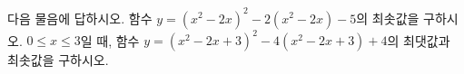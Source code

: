다음 물음에 답하시오.
 함수 $y=(x^2-2x)^2-2(x^2-2x)-5$의 최솟값을 구하시오.
 $0\le x\le 3$일 때, 함수 $y=(x^2-2x+3)^2-4(x^2-2x+3)+4$의 최댓값과 최솟값을 구하시오.
